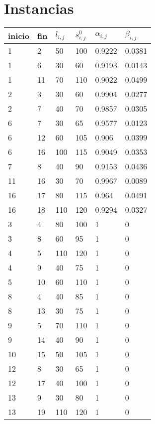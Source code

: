 \appendix

\section{Instancias} 

\begin{table}[H]
\centering
\begin{tabular}{|l|l|l|l|l|l|}
\hline
inicio & fin & $l_{i,j}$ & $s_{i,j}^0$ & $\alpha_{i,j}$ & $\beta_{i,j}$ \\ \hline
1 & 2 & 50 & 100 & 0.9222 & 0.0381 \\ \hline
1 & 6 & 30 & 60 & 0.9193 & 0.0143 \\ \hline
1 & 11 & 70 & 110 & 0.9022 & 0.0499 \\ \hline
2 & 3 & 30 & 60 & 0.9904 & 0.0277 \\ \hline
2 & 7 & 40 & 70 & 0.9857 & 0.0305 \\ \hline
6 & 7 & 30 & 65 & 0.9577 & 0.0123 \\ \hline
6 & 12 & 60 & 105 & 0.906 & 0.0399 \\ \hline
6 & 16 & 100 & 115 & 0.9049 & 0.0353 \\ \hline
7 & 8 & 40 & 90 & 0.9153 & 0.0436 \\ \hline
11 & 16 & 30 & 70 & 0.9967 & 0.0089 \\ \hline
16 & 17 & 80 & 115 & 0.964 & 0.0491 \\ \hline
16 & 18 & 110 & 120 & 0.9294 & 0.0327 \\ \hline
3 & 4 & 80 & 100 & 1 & 0 \\ \hline
3 & 8 & 60 & 95 & 1 & 0 \\ \hline
4 & 5 & 110 & 120 & 1 & 0 \\ \hline
4 & 9 & 40 & 75 & 1 & 0 \\ \hline
5 & 10 & 60 & 110 & 1 & 0 \\ \hline
8 & 4 & 40 & 85 & 1 & 0 \\ \hline
8 & 13 & 30 & 75 & 1 & 0 \\ \hline
9 & 5 & 70 & 110 & 1 & 0 \\ \hline
9 & 14 & 40 & 90 & 1 & 0 \\ \hline
10 & 15 & 50 & 105 & 1 & 0 \\ \hline
12 & 8 & 30 & 65 & 1 & 0 \\ \hline
12 & 17 & 40 & 100 & 1 & 0 \\ \hline
13 & 9 & 30 & 80 & 1 & 0 \\ \hline
13 & 19 & 110 & 120 & 1 & 0 \\ \hline

\end{tabular}
\end{table}
